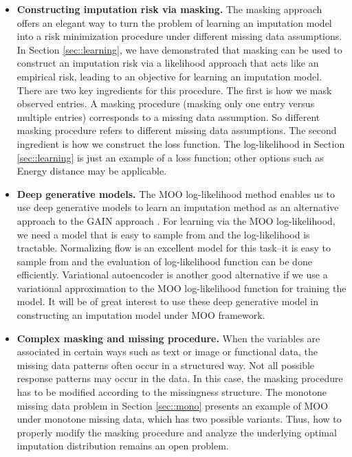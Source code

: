 \documentclass[aos, preprint]{imsart}
\theoremstyle{plain}
\theoremstyle{definition}
\begin{document}
\begin{itemize}
\item {\bf Constructing imputation risk via masking.}
The masking approach offers an elegant way to turn the problem of learning an imputation
model into a risk minimization procedure under different missing data assumptions.
In Section \ref{sec::learning}, we have demonstrated that
masking can be used to construct an imputation risk via a likelihood approach that acts like an empirical risk,
leading to an objective for learning an imputation model. 
There are two key ingredients for this procedure. 
The first is how we mask observed entries.
A masking procedure (masking only one entry versus multiple entries)
corresponds to a missing data assumption.
So different masking procedure refers to different missing data assumptions.
The second ingredient is how we construct the loss function. 
The log-likelihood in Section \ref{sec::learning} is just an example of a loss function; other options
such as Energy distance may be applicable. 



\item {\bf Deep generative models. }
The MOO log-likelihood method enables us to use deep generative models
to learn an imputation method as an alternative approach to the GAIN approach \citep{yoon2018gain}.
For learning via the MOO log-likelihood, we need a model that is easy to sample from and the log-likelihood is tractable. 
Normalizing flow \citep{papamakarios2021normalizing} is an excellent model for this task--it is easy to sample from and the evaluation
of log-likelihood function can be done efficiently.
Variational autoencoder \citep{pu2016variational} is another good alternative if we use a variational approximation
to the MOO log-likelihood function
for training the model. 
It will be of great interest to use these deep generative model
in constructing an imputation model under MOO framework.

\item {\bf Complex masking and missing procedure.}
When the variables are associated in certain ways such as text or image or functional data, 
the missing data patterns often occur in a structured way. 
Not all possible response patterns may occur in the data.
In this case, the masking procedure has to be modified according to the
missingness structure. 
The monotone missing data problem in Section \ref{sec::mono} presents
an example of MOO under monotone missing data, which has two possible variants. 
Thus, how to properly modify the masking procedure
and analyze the underlying optimal imputation distribution remains
an open problem. 



\end{itemize}
\end{document}
